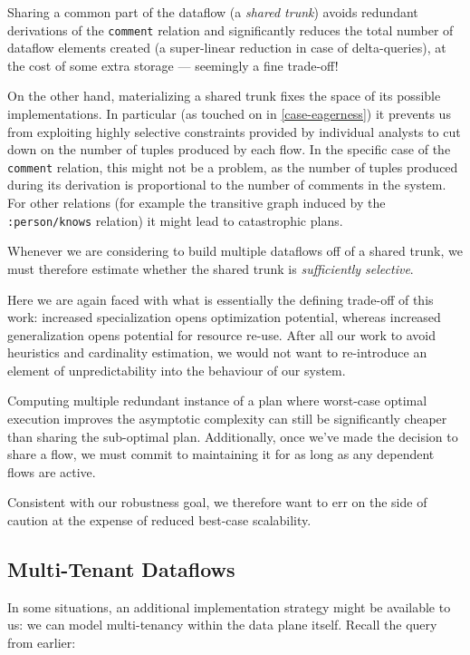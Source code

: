 \documentclass[../catalog.tex]{subfiles}
\begin{document}
Sharing a common part of the dataflow (a \emph{shared trunk}) avoids
redundant derivations of the \texttt{comment} relation and
significantly reduces the total number of dataflow elements created (a
super-linear reduction in case of delta-queries), at the cost of some
extra storage — seemingly a fine trade-off!

On the other hand, materializing a shared trunk fixes the space of its
possible implementations. In particular (as touched on in
\ref{case-eagerness}) it prevents us from exploiting highly selective
constraints provided by individual analysts to cut down on the number
of tuples produced by each flow. In the specific case of the
\texttt{comment} relation, this might not be a problem, as the number
of tuples produced during its derivation is proportional to the number
of comments in the system. For other relations (for example the
transitive graph induced by the \texttt{:person/knows} relation) it
might lead to catastrophic plans.

Whenever we are considering to build multiple dataflows off of a
shared trunk, we must therefore estimate whether the shared trunk is
\emph{sufficiently selective}.

Here we are again faced with what is essentially the defining
trade-off of this work: increased specialization opens optimization
potential, whereas increased generalization opens potential for
resource re-use. After all our work to avoid heuristics and
cardinality estimation, we would not want to re-introduce an element
of unpredictability into the behaviour of our system.

Computing multiple redundant instance of a plan where worst-case
optimal execution improves the asymptotic complexity can still be
significantly cheaper than sharing the sub-optimal plan. Additionally,
once we've made the decision to share a flow, we must commit to
maintaining it for as long as any dependent flows are active.

Consistent with our robustness goal, we therefore want to err on the
side of caution at the expense of reduced best-case
scalability.

\subsection{Multi-Tenant Dataflows}

In some situations, an additional implementation strategy might be
available to us: we can model multi-tenancy within the data plane
itself. Recall the query from earlier:
\end{document}
